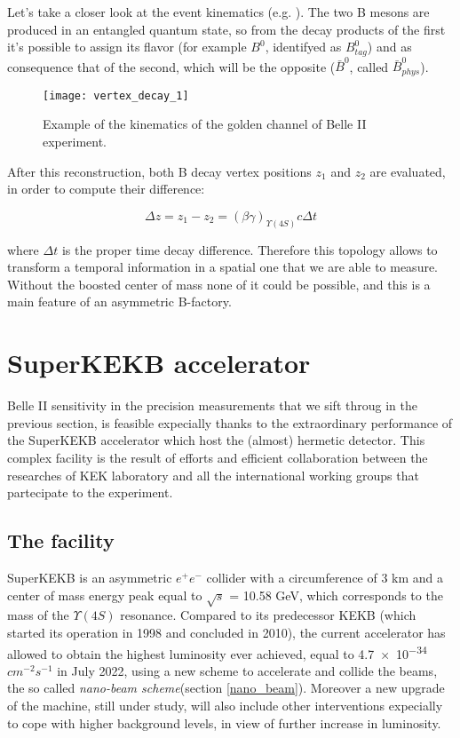 Let's take a closer look at the event kinematics (e.g. ). The two B mesons are produced in an entangled quantum state, so from the decay products of the first it's possible to assign its flavor (for example $B^{0}$, identifyed as $B_{tag}^{0}$) and as consequence that of the second, which will be the opposite ($\bar{B}^{0}$, called $\bar{B}_{phys}^{0}$).

\begin{figure}[h!]
\centering
\texttt{[image: vertex\_decay\_1]}
\caption{Example of the kinematics of the golden channel of Belle II experiment.}
\label{fig:decay_vertex}
\end{figure}

After this reconstruction, both B decay vertex positions $\textit{z}_{1}$ and $\textit{z}_{2}$ are evaluated, in order to compute their difference:

\begin{equation}
\Delta \textit{z} = \textit{z}_{1} - \textit{z}_{2} = (\beta\gamma)_{\Upsilon(4S)}c\Delta t
\end{equation}

where $\Delta t$ is the proper time decay difference. Therefore this topology allows to transform a temporal information in a spatial one that we are able to measure. Without the boosted center of mass none of it could be possible, and this is a main feature of an asymmetric B-factory.



\section{SuperKEKB accelerator}

Belle II sensitivity in the precision measurements that we sift throug in the previous section, is feasible expecially thanks to the extraordinary performance of the SuperKEKB accelerator which host the (almost) hermetic detector. This complex facility is the result of efforts and efficient collaboration between the researches of KEK laboratory and all the international working groups that partecipate to the experiment.


\subsection{The facility}

SuperKEKB is an asymmetric $e^{+}e^{-}$ collider with a circumference of 3 km and a center of mass energy peak equal to  $\sqrt{s}$ = 10.58 GeV, which corresponds to the mass of the $\Upsilon(4S)$ resonance.
Compared to its predecessor KEKB (which started its operation in 1998 and concluded in 2010), the current accelerator has allowed to obtain the highest luminosity ever achieved, equal to \num{4.7e-34} $cm^{-2}s^{-1}$ in July 2022, using a new scheme to accelerate and collide the beams, the so called \textit{nano-beam scheme}(section \vref{nano_beam}). Moreover a new upgrade of the machine, still under study, will also include other interventions expecially to cope with higher background levels, in view of further increase in luminosity.

